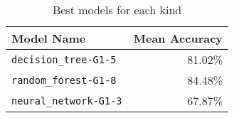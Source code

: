 \begin{table}[H]
\centering
\capstart
\begin{tabularx}{0.48\textwidth}{|X|r|}
\hline
Model Name & Mean Accuracy \\
\hline
\texttt{decision\_tree-G1-5} & 81.02\% \\
\texttt{random\_forest-G1-8} & 84.48\% \\
\texttt{neural\_network-G1-3} & 67.87\% \\
\hline
\end{tabularx}
\caption{Best models for each kind}
\label{tab:best_model_per_kind}

\end{table}

